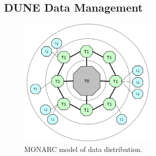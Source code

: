 \subsection{DUNE Data Management}

\begin{figure}[h!]
\centering
\includegraphics[width=0.6\textwidth]{monarc-model.png}
\caption{MONARC model of data distribution.}
\label{fig:monarc}
\end{figure}
